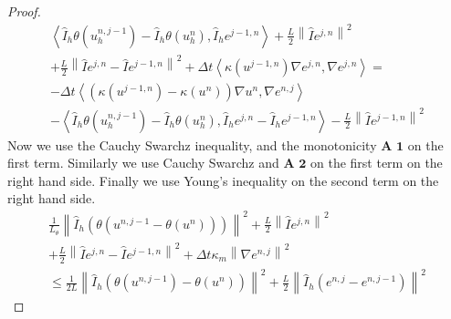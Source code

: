 \documentclass[../Main/main.tex]{subfiles}
\begin{document}
\begin{proof}
		\begin{equation}
			\begin{gathered}
				\left \langle \hat{I}_h \theta(u^{n,j-1}_h) - \hat{I}_h \theta(u^{n}_h),\hat{I}_h e^{j-1,n} \right \rangle +\frac{L}{2}\left \| \hat{I} e^{j,n}\right \|^2 	 \\
				 + \frac{L}{2}\left \| \hat{I} e^{j,n}-\hat{I}e^{j-1,n} \right \|^2 + 
				\Delta t \left \langle \kappa(u^{j-1,n}) \nabla e^{j,n}, \nabla e^{j,n} \right \rangle  = \\ -\Delta t \left \langle (\kappa(u^{j-1,n})-\kappa(u^n))\nabla u^n,\nabla e^{n,j}\right \rangle \\ - \left \langle \hat{I}_h \theta(u^{n,j-1}_h) - \hat{I}_h \theta(u^{n}_h),\hat{I}_h e^{j,n} - \hat{I}_h e^{j-1,n}\right \rangle-\frac{L}{2}\left \| \hat{I} e^{j-1,n}\right \|^2
			\end{gathered}
		\end{equation}
		Now we use the Cauchy Swarchz inequality, and the monotonicity $\textbf{A 1}$ on the first term. Similarly we use Cauchy Swarchz and $\textbf{A 2}$ on the first term on the right hand side. Finally we use Young's inequality on the second term on the right hand side.
		\begin{equation}
			\begin{gathered}
				\frac{1}{L_{\theta}}\left \| \hat{I}_h (\theta(u^{n,j-1}-\theta(u^{n}))) \right \|^2 + \frac{L}{2}\left \| \hat{I} e^{j,n}\right \|^2 \\
				+ \frac{L}{2}\left \| \hat{I} e^{j,n}-\hat{I}e^{j-1,n} \right \|^2 + \Delta t \kappa_m \left \| \nabla e^{n,j} \right \|^2 \\
				\leq \frac{1}{2L} \left \| \hat{I}_h(\theta (u^{n,j-1})-\theta (u^n) ) \right \|^2  + \frac{L}{2} \left \|\hat{I}_h( e^{n,j} - e^{n,j-1}) \right \|^2
			\end{gathered}
		\end{equation} 
	\end{proof}
	
\end{document}
